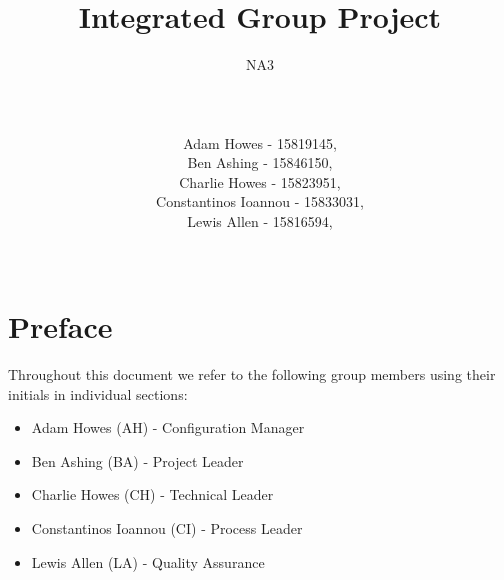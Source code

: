 \documentclass[a4paper]{article}
\title{\vspace{-2cm}Integrated Group Project}
\author{NA3
	\\ \rule{5cm}{0.4pt}
	\\Adam Howes - 15819145,
	\\Ben Ashing - 15846150,
	\\Charlie Howes - 15823951,
	\\Constantinos Ioannou - 15833031,
	\\Lewis Allen - 15816594,
    \\ \rule{5cm}{0.4pt}
}
\begin{document}
\maketitle

\tableofcontents

\break

\section{Preface}
Throughout this document we refer to the following group members using their initials in individual sections:
\begin{itemize}
    \item Adam Howes (AH) - Configuration Manager 
    \item Ben Ashing (BA) - Project Leader
    \item Charlie Howes (CH) - Technical Leader
    \item Constantinos Ioannou (CI) - Process Leader
    \item Lewis Allen (LA) - Quality Assurance
\end{itemize}
\end{document}
